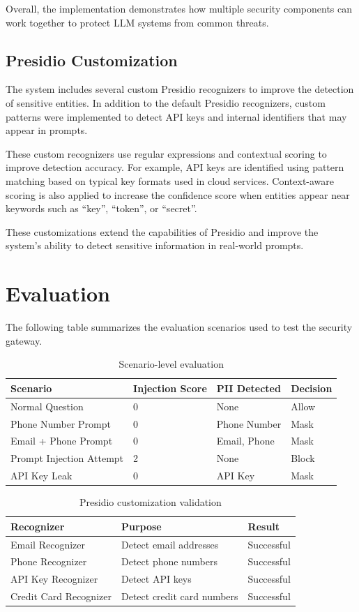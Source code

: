 \documentclass[conference]{IEEEtran}
\begin{document}
Overall, the implementation demonstrates how multiple security components can work together to protect LLM systems from common threats.
\subsection{Presidio Customization}

The system includes several custom Presidio recognizers to improve the detection of sensitive entities. 
In addition to the default Presidio recognizers, custom patterns were implemented to detect API keys and 
internal identifiers that may appear in prompts.

These custom recognizers use regular expressions and contextual scoring to improve detection accuracy. 
For example, API keys are identified using pattern matching based on typical key formats used in cloud 
services. Context-aware scoring is also applied to increase the confidence score when entities appear 
near keywords such as “key”, “token”, or “secret”.

These customizations extend the capabilities of Presidio and improve the system’s ability to detect 
sensitive information in real-world prompts.

\section{Evaluation}
The following table summarizes the evaluation scenarios used to test the security gateway.
\begin{table}[htbp]
\centering
\begin{tabular}{|l|l|l|l|}
\hline
Scenario & Injection Score & PII Detected & Decision \\
\hline
Normal Question & 0 & None & Allow \\
Phone Number Prompt & 0 & Phone Number & Mask \\
Email + Phone Prompt & 0 & Email, Phone & Mask \\
Prompt Injection Attempt & 2 & None & Block \\
API Key Leak & 0 & API Key & Mask \\
\hline
\end{tabular}
\caption{Scenario-level evaluation}
\end{table}

\begin{table}[h]
\centering
\begin{tabular}{|l|l|l|}
\hline
Recognizer & Purpose & Result \\
\hline
Email Recognizer & Detect email addresses & Successful \\
Phone Recognizer & Detect phone numbers & Successful \\
API Key Recognizer & Detect API keys & Successful \\
Credit Card Recognizer & Detect credit card numbers & Successful \\
\hline
\end{tabular}
\caption{Presidio customization validation}
\end{table}
\end{document}
